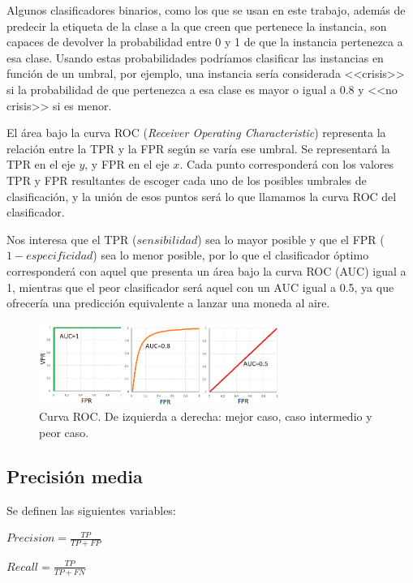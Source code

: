 Algunos clasificadores binarios, como los que se usan en este trabajo, además de predecir la etiqueta de la clase a la que creen que pertenece la instancia, son capaces de devolver la probabilidad entre 0 y 1 de que la instancia pertenezca a esa clase. Usando estas probabilidades podríamos clasificar las instancias en función de un umbral, por ejemplo, una instancia sería considerada <<crisis>> si la probabilidad de que pertenezca a esa clase es mayor o igual a 0.8 y <<no crisis>> si es menor. 

El área bajo la curva ROC (\textit{Receiver Operating Characteristic}) representa la relación entre la TPR y la FPR según se varía ese umbral. Se representará la TPR en el eje $y$, y FPR en el eje $x$. Cada punto corresponderá con los valores TPR y FPR resultantes de escoger cada uno de los posibles umbrales de clasificación, y la unión de esos puntos será lo que llamamos la curva ROC del clasificador.

Nos interesa que el TPR ($sensibilidad$) sea lo mayor posible y que el FPR ($1-especificidad$) sea lo menor posible, por lo que el clasificador óptimo corresponderá con aquel que presenta un área bajo la curva ROC (AUC) igual a 1, mientras que el peor clasificador será aquel con un AUC igual a 0.5, ya que ofrecería una predicción equivalente a lanzar una moneda al aire. 

\begin{figure}[H]
	\centering
	\includegraphics[width=0.7\textwidth]{../img/roc.png}
	\caption[Curva ROC]{Curva ROC. De izquierda a derecha: mejor caso, caso intermedio y peor caso.}
	\label{fig:roc}
\end{figure} 

\subsection{Precisión media}

Se definen las siguientes variables: 
\begin{center}
	$Precision=\frac{TP}{TP+FP}$
\end{center}
\begin{center}
	$Recall=\frac{TP}{TP+FN}$
\end{center}

